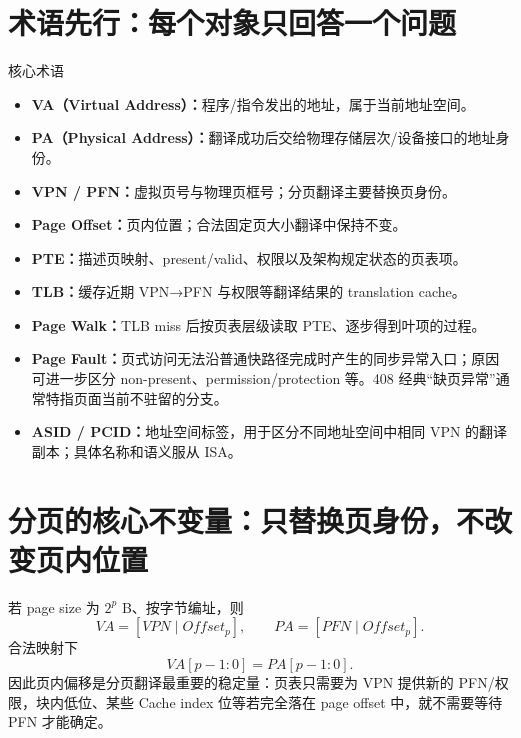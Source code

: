 \documentclass[UTF8,fontset=fandol,11pt,a4paper]{ctexart}
\newcommand{\kw}[1]{\textbf{\color{deep}#1}}\newcommand{\code}[1]{\texttt{#1}}
\begin{document}
\section{术语先行：每个对象只回答一个问题}
\begin{methodbox}{核心术语}
\begin{itemize}
\item \kw{VA（Virtual Address）：}程序/指令发出的地址，属于当前地址空间。
\item \kw{PA（Physical Address）：}翻译成功后交给物理存储层次/设备接口的地址身份。
\item \kw{VPN / PFN：}虚拟页号与物理页框号；分页翻译主要替换页身份。
\item \kw{Page Offset：}页内位置；合法固定页大小翻译中保持不变。
\item \kw{PTE：}描述页映射、present/valid、权限以及架构规定状态的页表项。
\item \kw{TLB：}缓存近期 VPN→PFN 与权限等翻译结果的 translation cache。
\item \kw{Page Walk：}TLB miss 后按页表层级读取 PTE、逐步得到叶项的过程。
\item \kw{Page Fault：}页式访问无法沿普通快路径完成时产生的同步异常入口；原因可进一步区分 non-present、permission/protection 等。408 经典“缺页异常”通常特指页面当前不驻留的分支。
\item \kw{ASID / PCID：}地址空间标签，用于区分不同地址空间中相同 VPN 的翻译副本；具体名称和语义服从 ISA。
\end{itemize}
\end{methodbox}

\section{分页的核心不变量：只替换页身份，不改变页内位置}
若 page size 为 $2^p$ B、按字节编址，则
\[
VA=[VPN\mid Offset_p],
\qquad
PA=[PFN\mid Offset_p].
\]
合法映射下
\[
\boxed{VA[p-1:0]=PA[p-1:0]}.
\]
因此页内偏移是分页翻译最重要的稳定量：页表只需要为 VPN 提供新的 PFN/权限，块内低位、某些 Cache index 位等若完全落在 page offset 中，就不需要等待 PFN 才能确定。
\end{document}
